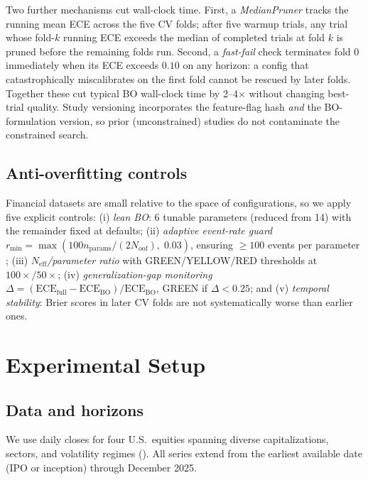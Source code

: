 \documentclass[11pt,a4paper]{article}
\newcommand{\Neff}{N_{\text{eff}}}
\begin{document}
Two further mechanisms cut wall-clock time. First, a \emph{MedianPruner} \cite{golovin2017google} tracks the running mean ECE across the five CV folds; after five warmup trials, any trial whose fold-$k$ running ECE exceeds the median of completed trials at fold $k$ is pruned before the remaining folds run. Second, a \emph{fast-fail} check terminates fold 0 immediately when its ECE exceeds $0.10$ on any horizon: a config that catastrophically miscalibrates on the first fold cannot be rescued by later folds. Together these cut typical BO wall-clock time by 2--4$\times$ without changing best-trial quality. Study versioning incorporates the feature-flag hash \emph{and} the BO-formulation version, so prior (unconstrained) studies do not contaminate the constrained search.

\subsection{Anti-overfitting controls}
\label{sec:antioverfitting}

Financial datasets are small relative to the space of configurations, so we apply five explicit controls:
(i) \emph{lean BO}: 6 tunable parameters (reduced from 14) with the remainder fixed at defaults;
(ii) \emph{adaptive event-rate guard} $r_\text{min} = \max(100 n_\text{params}/(2 N_\text{oof}),\; 0.03)$, ensuring $\geq 100$ events per parameter \cite{vittinghoff2007relaxing};
(iii) \emph{$\Neff$/parameter ratio} with GREEN/YELLOW/RED thresholds at $100\times / 50\times$;
(iv) \emph{generalization-gap monitoring} $\Delta = (\text{ECE}_\text{full} - \text{ECE}_\text{BO}) / \text{ECE}_\text{BO}$, GREEN if $\Delta < 0.25$; and
(v) \emph{temporal stability}: Brier scores in later CV folds are not systematically worse than earlier ones.

\section{Experimental Setup}
\label{sec:experiments}

\subsection{Data and horizons}

We use daily closes for four U.S.\ equities spanning diverse capitalizations, sectors, and volatility regimes (). All series extend from the earliest available date (IPO or inception) through December 2025.
\end{document}
